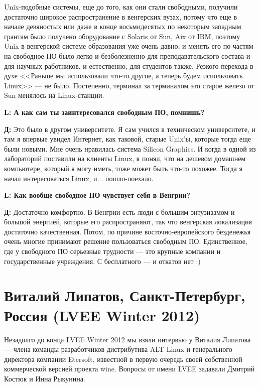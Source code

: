 \documentclass[10pt, a5paper]{article}
\begin{document}
Unix-подобные системы, еще до того, как они стали свободными, получили достаточно широкое распространение в венгерских вузах, потому что еще в начале девяностых или даже в конце восьмидесятых по некоторым западным грантам было получено оборудование с Solaris от Sun, Aix от IBM, поэтому Unix в венгерской системе образования уже очень давно, и менять его по частям на свободное ПО было легко и безболезненно для преподавательского состава и для научных работников, и естественно, для студентов также. Резкого перехода в духе <<Раньше мы использовали что-то другое, а теперь будем использовать Linux>> --- не было. Постепенно, терминал за терминалом это старое железо от Sun менялось на Linux-станции.

{\noindent \bf L: А как сам ты заинтересовался свободным ПО, помнишь?}

{\noindent \bf Д:}  Это было в другом университете. Я сам учился в техническом университете, и там я впервые увидел Интернет, как таковой, старые Unix'ы, которые тогда еще были новыми. Мне очень нравилась система Silicon Graphics. И когда в одной из лабораторий поставили на клиенты Linux, я понял, что на дешевом домашнем компьютере, который я могу иметь, тоже может быть что-то похожее. Тогда я начал интересоваться Linux, и... пошло-поехало.

{\noindent \bf L: Как вообще свободное ПО чувствует себя в Венгрии?}

{\noindent \bf Д:} Достаточно комфортно. В Венгрии есть люди с большим энтузиазмом и большой энергией, которые его распространяют, так что венгерская локализация  достаточно качественная. Потом, по причине восточно-европейского безденежья очень многие принимают решение пользоваться свободным ПО. Единственное, где у свободного ПО серьезные трудности --- это крупные компании и государственные учреждения. С бесплатного --- и откатов нет :)

\section[Виталий Липатов, Санкт-Петербург, Россия (LVEE Winter 2012)]{Виталий Липатов, Санкт-Петербург, \linebreak Россия (LVEE Winter 2012)}

Незадолго до конца LVEE Winter 2012 мы взяли интервью у Виталия Липатова --- члена команды разработчиков  дистрибутива ALT Linux и генерального директора компании Etersoft, известной в первую очередь своей собственной коммерческой версией проекта wine. Вопросы от имени LVEE задавали Дмитрий Костюк и Инна Рыкунина.
\end{document}
